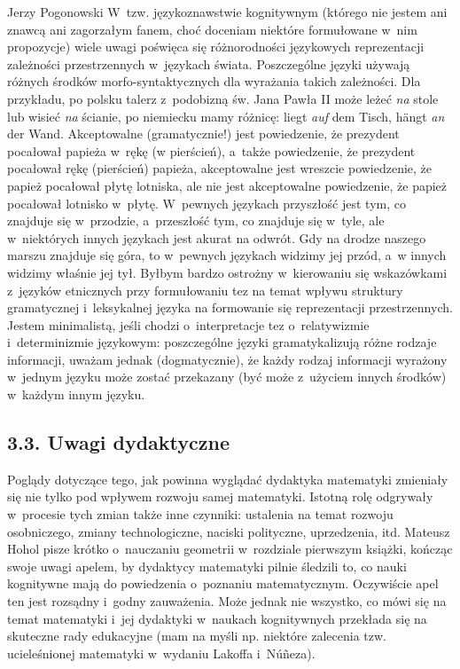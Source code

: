 \begin{newrevplenv}{Jerzy Pogonowski}
W~tzw. językoznawstwie kognitywnym (którego nie jestem ani znawcą
ani zagorzałym fanem, choć doceniam niektóre formułowane w~nim
propozycje) wiele uwagi poświęca się różnorodności językowych
reprezentacji zależności przestrzennych w~językach świata.
Poszczególne języki używają różnych środków morfo-syntaktycznych
dla wyrażania takich zależności. Dla przykładu, po polsku talerz z~podobizną św. Jana Pawła II może leżeć {\em na} stole lub wisieć
{\em na} ścianie, po niemiecku mamy różnicę: liegt {\em auf} dem
Tisch, h\"{a}ngt {\em an} der Wand. Akceptowalne (gramatycznie!)
jest powiedzenie, że prezydent pocałował papieża w~rękę (w
pierścień), a~także powiedzenie, że prezydent pocałował rękę
(pierścień) papieża, akceptowalne jest wreszcie powiedzenie, że
papież pocałował płytę lotniska, ale nie jest akceptowalne
powiedzenie, że papież pocałował lotnisko w~płytę. W~pewnych
językach przyszłość jest tym, co znajduje się w~przodzie, a~przeszłość tym, co znajduje się w~tyle, ale w~niektórych innych
językach jest akurat na odwrót. Gdy na drodze naszego marszu
znajduje się góra, to w~pewnych językach widzimy jej przód, a~w
innych widzimy właśnie jej tył. Byłbym bardzo ostrożny w~kierowaniu się wskazówkami z~języków etnicznych przy formułowaniu
tez na temat wpływu struktury gramatycznej i~leksykalnej języka na
formowanie się reprezentacji przestrzennych. Jestem minimalistą,
jeśli chodzi o~interpretacje tez o~relatywizmie i~determinizmie
językowym: poszczególne języki gramatykalizują różne rodzaje
informacji, uważam jednak (dogmatycznie), że każdy rodzaj
informacji wyrażony w~jednym języku może zostać przekazany (być
może z~użyciem innych środków) w~każdym innym języku.

\subsection{3.3. Uwagi dydaktyczne}

Poglądy dotyczące tego, jak powinna wyglądać dydaktyka matematyki
zmieniały się nie tylko pod wpływem rozwoju samej matematyki.
Istotną rolę odgrywały w~procesie tych zmian także inne czynniki:
ustalenia na temat rozwoju osobniczego, zmiany technologiczne,
naciski polityczne, uprzedzenia, itd. Mateusz Hohol pisze krótko o~nauczaniu geometrii w~rozdziale pierwszym książki, kończąc swoje
uwagi apelem, by dydaktycy matematyki pilnie śledzili to, co nauki
kognitywne mają do powiedzenia o~poznaniu matematycznym.
Oczywiście apel ten jest rozsądny i~godny zauważenia. Może jednak
nie wszystko, co mówi się na temat matematyki i~jej dydaktyki w~naukach kognitywnych przekłada się na skuteczne rady edukacyjne
(mam na myśli np. niektóre zalecenia tzw. ucieleśnionej matematyki
w~wydaniu Lakoffa i~N\'{u}\~{n}eza).


\end{newrevplenv}
